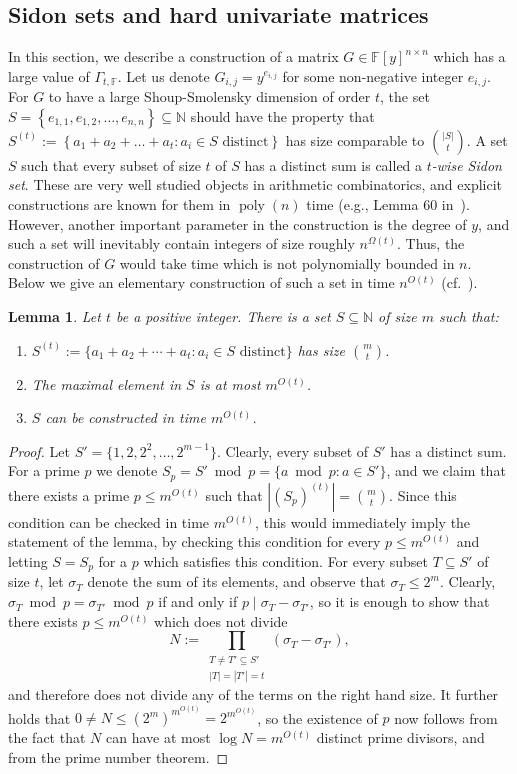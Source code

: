 \documentclass[10pt,a4paper]{article}
\newtheorem{lemma}[theorem]{Lemma}
\newcommand{\F}{\mathbb F}
\newcommand{\N}{\mathbb N}
\newcommand{\set}[1]{\left\{#1\right\}}
\DeclareMathOperator{\poly}{poly}
\begin{document}
\subsection{Sidon sets and hard univariate matrices}\label{sec:sidon-ss dim}
In this section, we describe a construction of a matrix $G \in \F[y]^{n \times n}$ which has a large value of $\Gamma_{t, \F}$. Let us denote $G_{i,j} = y^{e_{i,j}}$ for some non-negative integer $e_{i,j}$. For $G$ to have a large Shoup-Smolensky dimension of order $t$, the set $S = \set{e_{1,1}, e_{1,2}, \ldots, e_{n,n}} \subseteq \N$ should have the property that $S^{(t)} := \set{a_1 + a_2 + \ldots + a_t : a_i \in S \text{ distinct}}$ has size comparable to $\binom{|S|}{t}$. A set $S$ such that every subset of size $t$ of $S$ has a distinct sum is called a \emph{$t$-wise Sidon set}. These are very well studied objects in arithmetic combinatorics, and explicit constructions are known for them in $\poly(n)$ time (e.g., Lemma 60 in~\cite{Bshouty}). However, another important parameter in the construction is the degree of $y$, and such a set will inevitably contain integers of size roughly $n^{\Omega(t)}$. Thus, the construction of $G$ would take time which is not polynomially bounded in $n$. Below we give an elementary construction of such a set in time $n^{O(t)}$ (cf.\ \cite{AGKS15}).

\begin{lemma}\label{lem:easy-sidon}
Let $t$ be a positive integer. There is a set $S\subseteq\N$ of size $m$ such that:
\begin{enumerate}
\item $S^{(t)}:=\{a_1+a_2+\cdots+a_t:a_i\in S\text{ distinct}\}$ has size $\binom mt$.
\item The maximal element in $S$ is at most $m^{O(t)}$.
\item $S$ can be constructed in time $m^{O(t)}$.
\end{enumerate}
\end{lemma}
\begin{proof}
Let $S'=\{1,2,2^2,\ldots,2^{m-1}\}$. Clearly, every subset of $S'$ has a distinct sum. For a prime $p$ we denote $S_p=S'\bmod p=\{a\bmod p:a\in S'\}$, and we claim that there exists a prime $p\le m^{O(t)}$ such that $|(S_p)^{(t)}|=\binom mt$. Since this condition can be checked in time $m^{O(t)}$, this would immediately imply the statement of the lemma, by checking this condition for every $p\le m^{O(t)}$ and letting $S=S_p$ for a $p$ which satisfies this condition.
For every subset $T\subseteq S'$ of size $t$, let $\sigma_T$ denote the sum of its elements, and observe that $\sigma_T\le2^m$. Clearly, $\sigma_T\bmod p=\sigma_{T'}\bmod p$ if and only if $p\mid\sigma_T-\sigma_{T'}$, so it is enough to show that there exists $p\le m^{O(t)}$ which does not divide
\[N:=\prod_{\substack{T\ne T'\subseteq S'\\|T|=|T'|=t}}(\sigma_T-\sigma_{T'}),\]
and therefore does not divide any of the terms on the right hand size. It further holds that $0\ne N\le(2^m)^{m^{O(t)}}=2^{m^{O(t)}}$, so the existence of $p$ now follows from the fact that $N$ can have at most $\log N=m^{O(t)}$ distinct prime divisors, and from the prime number theorem.
\end{proof}
\end{document}
